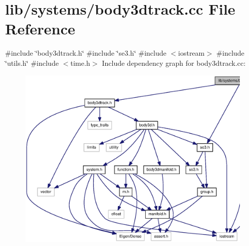 \section{lib/systems/body3dtrack.cc \-File \-Reference}
\label{body3dtrack_8cc}
{\ttfamily \#include \char`\"{}body3dtrack.\-h\char`\"{}}\*
{\ttfamily \#include \char`\"{}se3.\-h\char`\"{}}\*
{\ttfamily \#include $<$iostream$>$}\*
{\ttfamily \#include \char`\"{}utils.\-h\char`\"{}}\*
{\ttfamily \#include $<$time.\-h$>$}\*
\-Include dependency graph for body3dtrack.\-cc\-:\nopagebreak
\begin{figure}[H]
\begin{center}
\leavevmode
\includegraphics[width=350pt]{body3dtrack_8cc__incl}
\end{center}
\end{figure}
